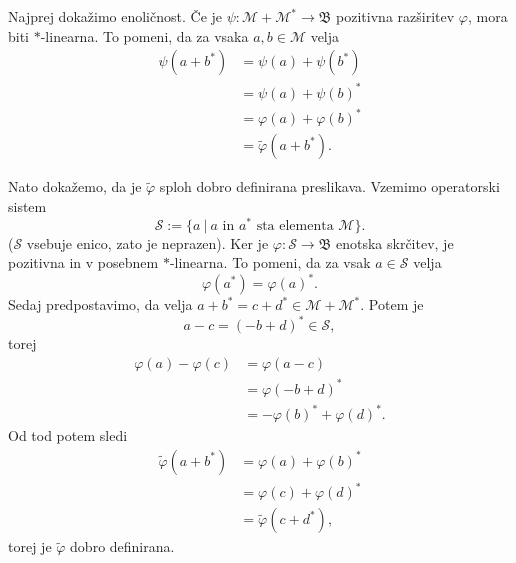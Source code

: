 \begin{dokaz}
    Najprej dokažimo enoličnost. Če je $\psi: \mathcal{M} + \mathcal{M}^* \to \mathfrak{B}$ pozitivna razširitev
    $\varphi$, mora biti $*$-linearna. To pomeni, da za vsaka $a, b \in \mathcal{M}$ velja
    \begin{align*}
        \psi (a + b^*) &= \psi(a) + \psi(b^*) \\
        &= \psi(a) + \psi(b)^* \\
        &= \varphi(a) + \varphi(b)^* \\
        &= \tilde{\varphi} (a + b^*).
    \end{align*} 
    
    Nato dokažemo, da je $\tilde{\varphi}$ sploh dobro definirana preslikava.
    Vzemimo operatorski sistem 
    $$\mathcal{S} := \{a\ |\ \text{$a$ in $a^*$ sta elementa $\mathcal{M}$}\}.$$
    ($\mathcal{S}$ vsebuje enico, zato je neprazen).
    Ker je $\varphi: \mathcal{S} \to \mathfrak{B}$ enotska skrčitev, je pozitivna in v posebnem $*$-linearna.
    To pomeni, da za vsak $a \in \mathcal{S}$ velja
    $$\varphi (a^*) = \varphi(a)^*.$$
    Sedaj predpostavimo, da velja $a + b^* = c + d^* \in \mathcal{M} + \mathcal{M}^*$.
    Potem je $$a - c = (-b + d)^* \in \mathcal{S},$$
    torej 
    \begin{align*}
        \varphi(a) - \varphi(c) &= \varphi(a - c)\\
        &=\varphi(-b + d)^* \\
        &=-\varphi(b)^* + \varphi(d)^*.
    \end{align*}
    Od tod potem sledi
    \begin{align*}
        \tilde{\varphi}(a + b^*) &= \varphi(a) + \varphi(b)^*\\
        &= \varphi(c)  + \varphi(d)^*\\
        &= \tilde{\varphi}(c + d^*),
    \end{align*}
    torej je $\tilde{\varphi}$ dobro definirana.


\end{dokaz}
